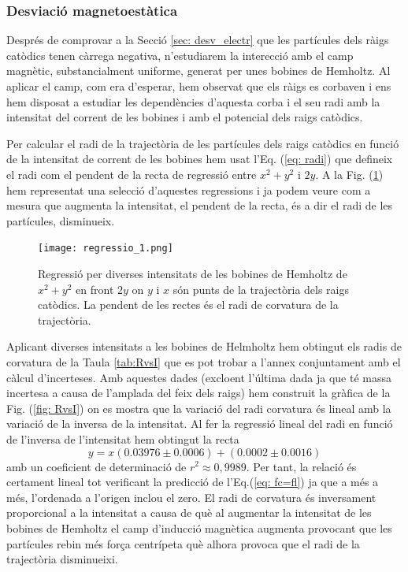 \documentclass[11pt]{article}
\numberwithin{equation}{section}
\numberwithin{figure}{section}
\numberwithin{table}{section}
\begin{document}
\subsubsection{Desviació magnetoestàtica}\label{sec: desv_magn}
Després de comprovar a la Secció \ref{sec: desv_electr} que les partícules dels ràigs catòdics tenen càrrega negativa, n'estudiarem la interecció amb el camp magnètic, substancialment uniforme, generat per unes bobines de Hemholtz. 
Al aplicar el camp, com era d'esperar, hem observat que els ràigs es corbaven i ens hem disposat a estudiar les dependències d'aquesta corba i el seu radi amb la intensitat del corrent de les bobines i amb el potencial dels raigs catòdics.

Per calcular el radi de la trajectòria de les partícules dels raigs catòdics en funció de la intensitat de corrent de les bobines hem usat l'Eq. (\ref{eq: radi}) que defineix el radi com el pendent de la recta de regressió entre $x^2+y^2$ i $2y$. A la Fig. (\ref{fig: regressio_1}) hem representat una selecció d'aquestes regressions i ja podem veure com a mesura que augmenta la intensitat, el pendent de la recta, és a dir el radi de les partícules, disminueix. 
\begin{figure}[H]
    \centering
    \texttt{[image: regressio\_1.png]}
    \caption{Regressió per diverses intensitats de les bobines de Hemholtz de $x^2+y^2$ en front $2y$ on $y$ i $x$ són punts de la trajectòria dels raigs catòdics. La pendent de les rectes és el radi de corvatura de la trajectòria.}
    \label{fig: regressio_1}
\end{figure}
Aplicant diverses intensitats a les bobines de Helmholtz hem obtingut els radis de corvatura de la Taula \ref{tab:RvsI} que es pot trobar a l'annex conjuntament amb el càlcul d'incerteses. Amb aquestes dades (excloent l'última dada ja que té massa incertesa a causa de l'amplada del feix dels raigs) hem construit la gràfica de la Fig. (\ref{fig: RvsI}) on es mostra que la variació del radi corvatura és lineal amb la variació de la inversa de la intensitat. 
Al fer la regressió lineal del radi en funció de l'inversa de l'intensitat hem obtingut la recta
\begin{equation}
    y=x(0.03976\pm0.0006)+(0.0002\pm0.0016)
\end{equation}  
amb un coeficient de determinació de $r^2\approx0,9989$. Per tant, la relació és certament lineal tot verificant la predicció de l'Eq.(\ref{eq: fc=fl}) ja que a més a més, l'ordenada a l'origen inclou el zero. El radi de corvatura és inversament proporcional a la intensitat a causa de què al augmentar la intensitat de les bobines de Hemholtz el camp d'inducció magnètica augmenta provocant que les partícules rebin més força centrípeta què alhora provoca que el radi de la trajectòria disminueixi.
\end{document}
